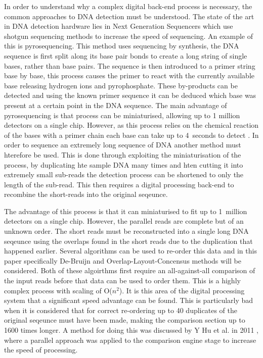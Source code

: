 \documentclass[conference]{IEEEtran}
\begin{document}
In order to understand why a complex digital back-end process is necessary, the common approaches to DNA detection must be understood. The state of the art in DNA detection hardware lies in Next Generation Sequencers which use shotgun sequencing methods to increase the speed of sequencing. An example of this is pyrosequencing. This method uses sequencing by synthesis, the DNA sequence is first split along its base pair bonds to create a long string of single bases, rather than base pairs. The sequence is then introduced to a primer string base by base, this process causes the primer to react with the currently available base releasing hydrogen ions and pyrophosphate. These by-products can be detected and using the known primer sequence it can be deduced which base was present at a certain point in the DNA sequence. The main advantage of pyrosequencing is that process can be miniaturised, allowing up to 1 million detectors on a single chip. However, as this process relies on the chemical reaction of the bases with a primer chain each base can take up to 4~seconds to detect \cite{rothberg2011integrated}. In order to sequence an extremely long sequence of DNA another method must hterefore be used. This is done through exploiting the miniaturisation of the process, by duplicating hte sample DNA many times and hten cutting it into extremely small sub-reads the detection process can be shortened to only the length of the sub-read. This then requires a digital processing back-end to recombine the short-reads into the original seqeunce. 

The advantage of this process is that it can miniaturised to fit up to 1~million detectors on a single chip. However, the parallel reads are complete but of an unknown order. The short reads must be reconstructed into a single long DNA seqeunce using the overlaps found in the short reads due to the duplication that happened earlier. Several algorithms can be used to re-order this data and in this paper specifically De-Bruijn and Overlap-Layout-Concensus methods will be considered. Both of these algoirthms first require an all-against-all comparison of the input reads before that data can be used to order them. This is a highly complex process with scaling of O($n^2$). It is this area of the digital processing system that a significant speed advantage can be found. This is particularly bad when it is considered that for correct re-ordering up to 40 duplicates of the original seqeunce must have been made, making the comparison section up to 1600 times longer. A method for doing this was discussed by Y Hu et al. in 2011 \cite{hu2011cmos}, where a parallel approach was applied to the comparison engine stage to increase the speed of processing.
\end{document}
